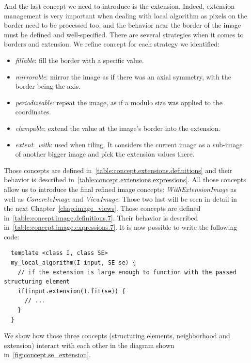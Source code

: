 And the last concept we need to introduce is the extension. Indeed, extension management is very important when dealing
with local algorithm as pixels on the border need to be processed too, and the behavior near the border of the image
must be defined and well-specified. There are several strategies when it comes to borders and extension. We refine
concept for each strategy we identified:
\begin{itemize}
  \item \emph{fillable}: fill the border with a specific value.
  \item \emph{mirrorable}: mirror the image as if there was an axial symmetry, with the border being the axis.
  \item \emph{periodizeable}: repeat the image, as if a modulo size was applied to the coordinates.
  \item \emph{clampable}: extend the value at the image's border into the extension.
  \item \emph{extent\_with}: used when tiling. It considers the current image as a sub-image of another bigger image and
        pick the extension values there.
\end{itemize}
Those concepts are defined in~\cref{table:concept.extensions.definitions} and their behavior is described
in~\cref{table:concept.extensions.expressions}. All those concepts allow us to introduce the final refined image
concepts: \emph{WithExtensionImage} as well as \emph{ConcreteImage} and \emph{ViewImage}. Those two last will be seen in
detail in the next Chapter~\ref{chap:image_views}. Those concepts are defined
in~\cref{table:concept.image.definitions.7}. Their behavior is described in~\cref{table:concept.image.expressions.7}. It
is now possible to write the following code:
\begin{verbatim}
  template <class I, class SE>
  my_local_algorithm(I input, SE se) {
    // if the extension is large enough to function with the passed structuring element
    if(input.extension().fit(se)) {
      // ...
    }
  }
\end{verbatim}

We show how those three concepts (structuring elements, neighborhood and extension) interact with each other in the
diagram shown in~\cref{fig:concept.se_extension}.

